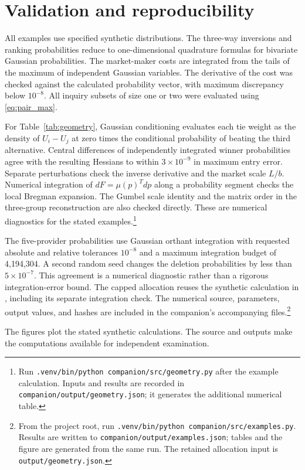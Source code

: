 \documentclass[11pt]{amsart}
\theoremstyle{definition}
\begin{document}
\section{Validation and reproducibility}
All examples use specified synthetic distributions. The three-way inversions and ranking probabilities reduce to one-dimensional quadrature formulas for bivariate Gaussian probabilities. The market-maker costs are integrated from the tails of the maximum of independent Gaussian variables. The derivative of the cost was checked against the calculated probability vector, with maximum discrepancy below $10^{-8}$. All inquiry subsets of size one or two were evaluated using \eqref{eq:pair_max}.

For Table~\ref{tab:geometry}, Gaussian conditioning evaluates each tie weight
as the density of $U_i-U_j$ at zero times the conditional probability of
beating the third alternative. Central differences of independently
integrated winner probabilities agree with the resulting Hessians to within
$3\times10^{-9}$ in maximum entry error. Separate perturbations check the
inverse derivative and the market scale $L/b$. Numerical integration of
$dF=\mu(p)^Tdp$ along a probability segment checks the local Bregman
expansion. The Gumbel scale identity and the matrix order in the three-group
reconstruction are also checked directly. These are numerical diagnostics
for the stated examples.\footnote{Run
\texttt{.venv/bin/python companion/src/geometry.py} after the example
calculation. Inputs and results are recorded in
\texttt{companion/output/geometry.json}; it generates the additional
numerical table.}

The five-provider probabilities use Gaussian orthant integration with requested absolute and relative tolerances $10^{-8}$ and a maximum integration budget of 4,194,304. A second random seed changes the deletion probabilities by less than $5\times10^{-7}$. This agreement is a numerical diagnostic rather than a rigorous integration-error bound. The capped allocation reuses the synthetic calculation in \cite{wuebben2026}, including its separate integration check. The numerical source, parameters, output values, and hashes are included in the companion's accompanying files.\footnote{From the project root, run \texttt{.venv/bin/python companion/src/examples.py}. Results are written to \texttt{companion/output/examples.json}; tables and the figure are generated from the same run. The retained allocation input is \texttt{output/geometry.json}.}

The figures plot the stated synthetic calculations. The source and outputs make the computations available for independent examination.
\end{document}

